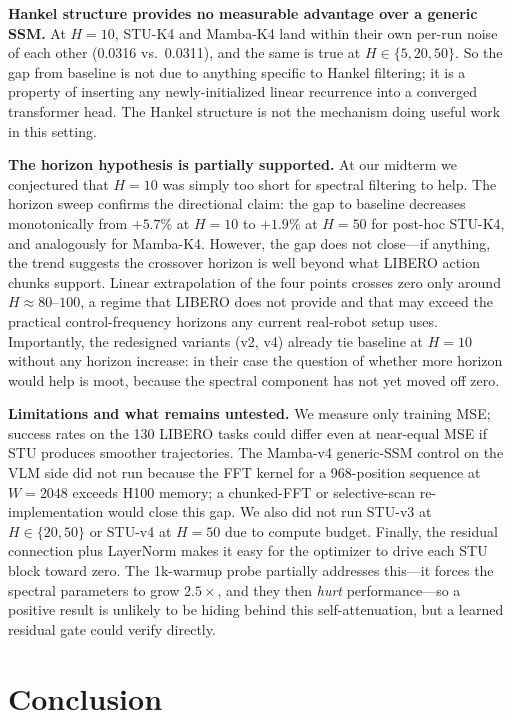 \documentclass[10pt, letterpaper]{article}
\begin{document}
\textbf{Hankel structure provides no measurable advantage over a generic SSM.}
At $H{=}10$, STU-K4 and Mamba-K4 land within their own per-run noise of each other (0.0316 vs.\ 0.0311), and the same is true at $H \in \{5, 20, 50\}$. So the gap from baseline is not due to anything specific to Hankel filtering; it is a property of inserting any newly-initialized linear recurrence into a converged transformer head. The Hankel structure is not the mechanism doing useful work in this setting.

\textbf{The horizon hypothesis is partially supported.}
At our midterm we conjectured that $H{=}10$ was simply too short for spectral filtering to help. The horizon sweep confirms the directional claim: the gap to baseline decreases monotonically from $+5.7\%$ at $H{=}10$ to $+1.9\%$ at $H{=}50$ for post-hoc STU-K4, and analogously for Mamba-K4. However, the gap does not close---if anything, the trend suggests the crossover horizon is well beyond what LIBERO action chunks support. Linear extrapolation of the four points crosses zero only around $H \approx 80$--$100$, a regime that LIBERO does not provide and that may exceed the practical control-frequency horizons any current real-robot setup uses. Importantly, the redesigned variants (v2, v4) already tie baseline at $H{=}10$ without any horizon increase: in their case the question of whether more horizon would help is moot, because the spectral component has not yet moved off zero.

\textbf{Limitations and what remains untested.}
We measure only training MSE; success rates on the 130 LIBERO tasks could differ even at near-equal MSE if STU produces smoother trajectories. The Mamba-v4 generic-SSM control on the VLM side did not run because the FFT kernel for a 968-position sequence at $W{=}2048$ exceeds H100 memory; a chunked-FFT or selective-scan re-implementation would close this gap. We also did not run STU-v3 at $H \in \{20, 50\}$ or STU-v4 at $H{=}50$ due to compute budget. Finally, the residual connection plus LayerNorm makes it easy for the optimizer to drive each STU block toward zero. The 1k-warmup probe partially addresses this---it forces the spectral parameters to grow $2.5\times$, and they then \emph{hurt} performance---so a positive result is unlikely to be hiding behind this self-attenuation, but a learned residual gate could verify directly.

\section*{Conclusion}
\end{document}
